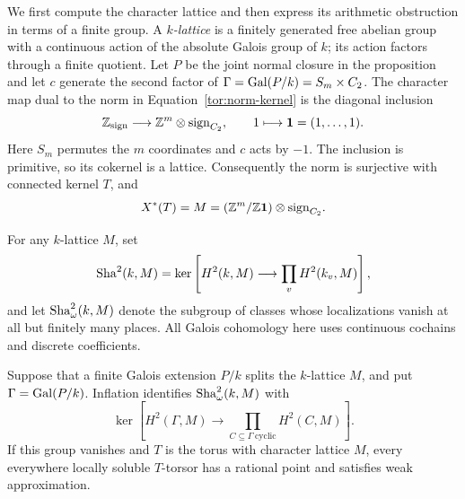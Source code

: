 We first compute the character lattice and then express its
arithmetic obstruction in terms of a finite group.
A \emph{$k$-lattice} is a finitely generated free abelian
group with a continuous action of the absolute Galois group of $k$;
its action factors through a finite quotient.
Let $P$ be the joint normal closure in the proposition and let $c$
generate the second factor of $\Gamma=\operatorname{Gal}(P/k)=S_m\times C_2$.
The character map dual to the norm in Equation~\eqref{tor:norm-kernel}
is the diagonal inclusion
\[
 \mathbb Z_{\mathrm{sign}}\longrightarrow
       \mathbb Z^m\otimes\mathrm{sign}_{C_2},\qquad
                       1\longmapsto\mathbf1=(1,\ldots,1).
\]
Here $S_m$ permutes the $m$ coordinates and $c$ acts by $-1$.
The inclusion is primitive, so its cokernel is a lattice.
Consequently the norm is surjective with connected kernel $T$,
and
\begin{equation}\label{tor:lattice}
       X^*(T)=M=(\mathbb Z^m/\mathbb Z\mathbf1)
                          \otimes\mathrm{sign}_{C_2}.
\end{equation}

For any $k$-lattice $M$, set
\[
 \operatorname{Sha}^2(k,M)=\ker\left[H^2(k,M)\longrightarrow
                              \prod_v H^2(k_v,M)\right],
\]
and let $\operatorname{Sha}^2_\omega(k,M)$ denote the subgroup of classes whose
localizations vanish at all but finitely many places.  All Galois
cohomology here uses continuous cochains and discrete coefficients.

\begin{lemma}\label{tor:cyclic-detection}
Suppose that a finite Galois extension $P/k$ splits the $k$-lattice
$M$, and put $\Gamma=\operatorname{Gal}(P/k)$.  Inflation identifies
$\operatorname{Sha}^2_\omega(k,M)$ with
\begin{equation}\label{tor:cyclic-kernel}
 \ker\left[H^2(\Gamma,M)\longrightarrow
                    \prod_{C\subseteq\Gamma\ \mathrm{cyclic}}H^2(C,M)
       \right].
\end{equation}
If this group vanishes and $T$ is the torus with character lattice
$M$, every everywhere locally soluble $T$-torsor has a rational
point and satisfies weak approximation.
\end{lemma}

